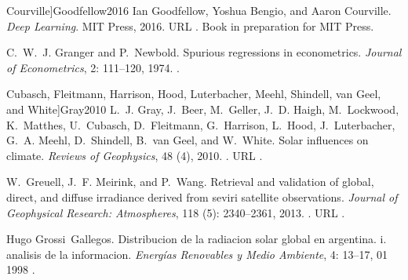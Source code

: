 \documentclass[letterpaper,12pt, twoside]{report}
\providecommand{\DIFdeltex}[1]{{\protect\color{red} \scriptsize #1}} %
\providecommand{\DIFdel}[1]{\texorpdfstring{\DIFdeltex{#1}}{}} %
\begin{document}
  Courville]{Goodfellow2016}
\DIFdel{Ian Goodfellow, Yoshua Bengio, and Aaron Courville.
}%
\DIFdel{\emph{Deep Learning}.
}%
\DIFdel{MIT Press, 2016.
}%
\DIFdel{URL }%
\DIFdel{.
}%
\DIFdel{Book in preparation for MIT Press.
}%

\DIFdel{C.~W.~J. Granger and P.~Newbold.
}%
\DIFdel{Spurious regressions in econometrics.
}%
\DIFdel{\emph{Journal of Econometrics}, 2:}%
\DIFdel{111--120, 1974.
}%
\DIFdel{.
}%

  Cubasch, Fleitmann, Harrison, Hood, Luterbacher, Meehl, Shindell, van Geel,
  and White]{Gray2010}
\DIFdel{L.~J. Gray, J.~Beer, M.~Geller, J.~D. Haigh, M.~Lockwood, K.~Matthes,
  U.~Cubasch, D.~Fleitmann, G.~Harrison, L.~Hood, J.~Luterbacher, G.~A. Meehl,
  D.~Shindell, B.~van Geel, and W.~White.
}%
\DIFdel{Solar influences on climate.
}%
\DIFdel{\emph{Reviews of Geophysics}, 48}%
\DIFdel{(4), 2010.
}%
\DIFdel{.
}%
\DIFdel{URL
  }%
\DIFdel{.
}%

\DIFdel{W.~Greuell, J.~F. Meirink, and P.~Wang.
}%
\DIFdel{Retrieval and validation of global, direct, and diffuse irradiance
  derived from seviri satellite observations.
}%
\DIFdel{\emph{Journal of Geophysical Research: Atmospheres}, 118}%
\DIFdel{(5):}%
\DIFdel{2340--2361, 2013.
}%
\DIFdel{.
}%
\DIFdel{URL
  }%
\DIFdel{.
}%

\DIFdel{Hugo Grossi~Gallegos.
}%
\DIFdel{Distribucion de la radiacion solar global en argentina. i. analisis
  de la informacion.
}%
\DIFdel{\emph{Energías Renovables y Medio Ambiente}, 4:}%
\DIFdel{13--17, 01
  1998}%
\DIFdel{.
}%
\end{document}
